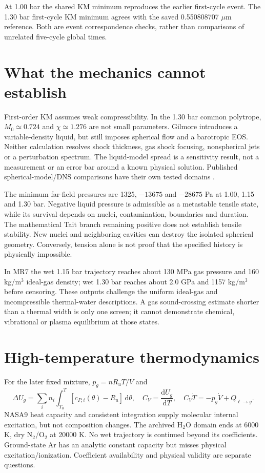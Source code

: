 \documentclass[10pt,a4paper]{article}
\newcommand{\dd}{\mathrm d}
\begin{document}
At 1.00 bar the shared KM minimum reproduces the earlier first-cycle event. The 1.30 bar first-cycle KM minimum agrees with the saved 0.550808707 $\mu$m reference. Both are event correspondence checks, rather than comparisons of unrelated five-cycle global times.
\clearpage
\section{What the mechanics cannot establish}
First-order KM assumes weak compressibility. In the 1.30 bar common polytrope, $M_0\simeq0.724$ and $\chi\simeq1.276$ are not small parameters. Gilmore introduces a variable-density liquid, but still imposes spherical flow and a barotropic EOS. Neither calculation resolves shock thickness, gas shock focusing, nonspherical jets or a perturbation spectrum. The liquid-model spread is a sensitivity result, not a measurement or an error bar around a known physical solution. Published spherical-model/DNS comparisons have their own tested domains \cite{nagy}.

The minimum far-field pressures are 1325, $-13675$ and $-28675$ Pa at 1.00, 1.15 and 1.30 bar. Negative liquid pressure is admissible as a metastable tensile state, while its survival depends on nuclei, contamination, boundaries and duration. The mathematical Tait branch remaining positive does not establish tensile stability. New nuclei and neighboring cavities can destroy the isolated spherical geometry. Conversely, tension alone is not proof that the specified history is physically impossible.

In MR7 the wet 1.15 bar trajectory reaches about 130 MPa gas pressure and 160 kg/m$^3$ ideal-gas density; wet 1.30 bar reaches about 2.0 GPa and 1157 kg/m$^3$ before censoring. These outputs challenge the uniform ideal-gas and incompressible thermal-water descriptions. A gas sound-crossing estimate shorter than a thermal width is only one screen; it cannot demonstrate chemical, vibrational or plasma equilibrium at those states.
\section{High-temperature thermodynamics}
For the later fixed mixture, $p_g=nR_uT/V$ and
\begin{equation}
\Delta U_g=\sum_i n_i\int_{T_0}^T[c_{P,i}(\theta)-R_u]\,\dd\theta,\quad
C_V=\frac{\dd U_g}{\dd T},\quad C_V\dot T=-p_g\dot V+Q_{\ell\to g}.
\end{equation}
NASA9 heat capacity and consistent integration supply molecular internal excitation, but not composition changes.
The archived H$_2$O domain ends at 6000 K, dry N$_2$/O$_2$ at 20000 K. No wet trajectory is continued beyond its coefficients. Ground-state Ar has an analytic constant capacity but misses physical excitation/ionization. Coefficient availability and physical validity are separate questions.
\end{document}
